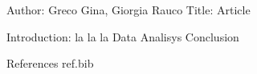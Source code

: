 Author: Greco Gina, Giorgia Rauco
Title: Article

Introduction: la la la
Data
Analisys
Conclusion


References
ref.bib
